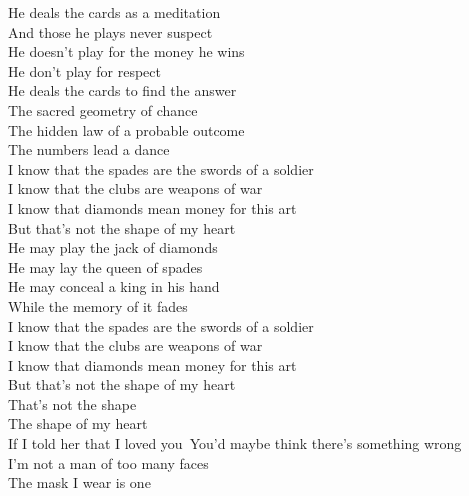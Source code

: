 \begin{flushleft}
He deals the cards as a meditation\\
And those he plays never suspect\\
He doesn't play for the money he wins\\
He don't play for respect\\
He deals the cards to find the answer\\
The sacred geometry of chance\\
The hidden law of a probable outcome\\
The numbers lead a dance\\
\hops
\hspace{0.9cm}I know that the spades are the swords of a soldier\\
\hspace{0.9cm}I know that the clubs are weapons of war\\
\hspace{0.9cm}I know that diamonds mean money for this art\\
\hspace{0.9cm}But that's not the shape of my heart\\
\hops
He may play the jack of diamonds\\
He may lay the queen of spades\\
He may conceal a king in his hand\\
While the memory of it fades\\
\hops
\hspace{0.9cm}I know that the spades are the swords of a soldier\\
\hspace{0.9cm}I know that the clubs are weapons of war\\
\hspace{0.9cm}I know that diamonds mean money for this art\\
\hspace{0.9cm}But that's not the shape of my heart\\
\hspace{0.9cm}That's not the shape\\
\hspace{0.9cm}The shape of my heart\\
\hops
If I told her that I loved you\
You'd maybe think there's something wrong\\
I'm not a man of too many faces\\
The mask I wear is one\\

\end{flushleft}
